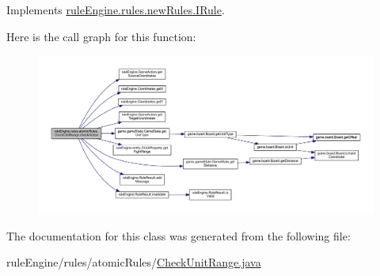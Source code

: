 Implements \mbox{\hyperlink{interfacerule_engine_1_1rules_1_1new_rules_1_1_i_rule_a72ce29a47d7a5fba75a09444a50a481e}{rule\+Engine.\+rules.\+new\+Rules.\+I\+Rule}}.

Here is the call graph for this function\+:
\nopagebreak
\begin{figure}[H]
\begin{center}
\leavevmode
\includegraphics[width=350pt]{classrule_engine_1_1rules_1_1atomic_rules_1_1_check_unit_range_a60608d1853c7963772dd07ba32733d11_cgraph}
\end{center}
\end{figure}


The documentation for this class was generated from the following file\+:\begin{DoxyCompactItemize}
\item 
rule\+Engine/rules/atomic\+Rules/\mbox{\hyperlink{_check_unit_range_8java}{Check\+Unit\+Range.\+java}}\end{DoxyCompactItemize}
